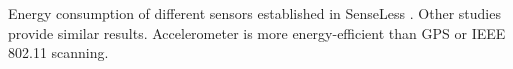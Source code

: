 Energy consumption of different sensors established in SenseLess \cite{benabdesslem:senseless}. Other studies provide similar results. Accelerometer is more energy-efficient than GPS or IEEE 802.11 scanning.

